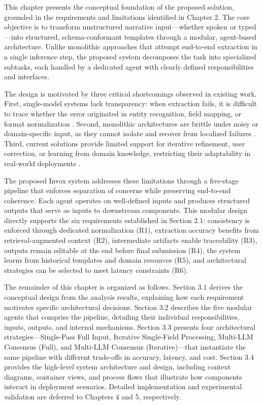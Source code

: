 This chapter presents the conceptual foundation of the proposed solution, grounded in the requirements and limitations identified in Chapter 2. The core objective is to transform unstructured narrative input—whether spoken or typed—into structured, schema-conformant templates through a modular, agent-based architecture. Unlike monolithic approaches that attempt end-to-end extraction in a single inference step, the proposed system decomposes the task into specialized subtasks, each handled by a dedicated agent with clearly defined responsibilities and interfaces.

The design is motivated by three critical shortcomings observed in existing work. First, single-model systems lack transparency: when extraction fails, it is difficult to trace whether the error originated in entity recognition, field mapping, or format normalization \cite{du2021template, sun2023slot}. Second, monolithic architectures are brittle under noisy or domain-specific input, as they cannot isolate and recover from localized failures \cite{wang2021spoken}. Third, current solutions provide limited support for iterative refinement, user correction, or learning from domain knowledge, restricting their adaptability in real-world deployments \cite{mialon2023augmented, park2023generative}.

The proposed Invox system addresses these limitations through a five-stage pipeline that enforces separation of concerns while preserving end-to-end coherence. Each agent operates on well-defined inputs and produces structured outputs that serve as inputs to downstream components. This modular design directly supports the six requirements established in Section 2.1: consistency is enforced through dedicated normalization (R1), extraction accuracy benefits from retrieval-augmented context (R2), intermediate artifacts enable traceability (R3), outputs remain editable at the end before final submission (R4), the system learns from historical templates and domain resources (R5), and architectural strategies can be selected to meet latency constraints (R6).

The remainder of this chapter is organized as follows. Section 3.1 derives the conceptual design from the analysis results, explaining how each requirement motivates specific architectural decisions. Section 3.2 describes the five modular agents that comprise the pipeline, detailing their individual responsibilities, inputs, outputs, and internal mechanisms. Section 3.3 presents four architectural strategies—Single-Pass Full Input, Iterative Single-Field Processing, Multi-LLM Consensus (Full), and Multi-LLM Consensus (Iterative)—that instantiate the same pipeline with different trade-offs in accuracy, latency, and cost. Section 3.4 provides the high-level system architecture and design, including context diagrams, container views, and process flows that illustrate how components interact in deployment scenarios. Detailed implementation and experimental validation are deferred to Chapters 4 and 5, respectively.

% 
% 
% 
